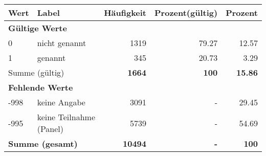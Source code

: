     \begin{longtable}{lXrrr}
     \toprule
     \textbf{Wert} & \textbf{Label} & \textbf{Häufigkeit} & \textbf{Prozent(gültig)} & \textbf{Prozent} \\
     \endhead
     \midrule
     \multicolumn{5}{l}{\textbf{Gültige Werte}}\\

     0 &
     \multicolumn{1}{X}{ nicht genannt   } &


       \num{1319} &
       \num[round-mode=places,round-precision=2]{79.27} &
         \num[round-mode=places,round-precision=2]{12.57} \\

     1 &
     \multicolumn{1}{X}{ genannt   } &


       \num{345} &
       \num[round-mode=places,round-precision=2]{20.73} &
         \num[round-mode=places,round-precision=2]{3.29} \\
     \midrule
     \multicolumn{2}{l}{Summe (gültig)} &
       \textbf{\num{1664}} &
     \textbf{\num{100}} &
       \textbf{\num[round-mode=places,round-precision=2]{15.86}} \\
     \multicolumn{5}{l}{\textbf{Fehlende Werte}}\\
       -998 &
       keine Angabe &
         \num{3091} &
        - &
         \num[round-mode=places,round-precision=2]{29.45} \\
       -995 &
       keine Teilnahme (Panel) &
         \num{5739} &
        - &
         \num[round-mode=places,round-precision=2]{54.69} \\
     \midrule
     \multicolumn{2}{l}{\textbf{Summe (gesamt)}} &
          \textbf{\num{10494}} &
        \textbf{-} &
        \textbf{\num{100}} \\
     \bottomrule
     \end{longtable}
     
